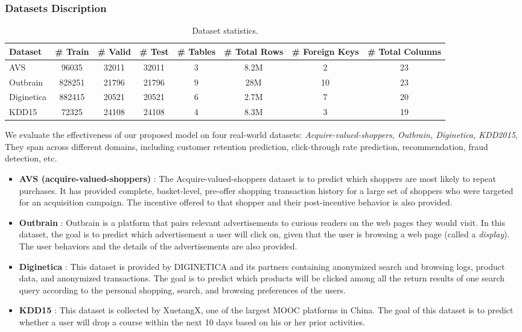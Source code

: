 \subsubsection{Datasets Discription}
\begin{table*}
    \caption{Dataset statistics.}
    \renewcommand\arraystretch{1.25}
    \centering
    \begin{tabular}{l|c|c|c|c|c|c|c}
        \toprule
        Dataset & \# Train & \# Valid & \# Test & \# Tables & \# Total Rows & \# Foreign Keys & \# Total Columns \\
        \midrule
        AVS         & 96035  & 32011 & 32011 & 3 & 8.2M & 2  & 23  \\
        Outbrain    & 828251 & 21796 & 21796 & 9 & 28M  & 10 & 23  \\
        Diginetica  & 882415 & 20521 & 20521 & 6 & 2.7M & 7  & 20  \\
        KDD15       & 72325  & 24108 & 24108 & 4 & 8.3M & 3  & 19  \\
        \bottomrule
    \end{tabular}
    \label{Dataset Information}
\end{table*}

We evaluate the effectiveness of our proposed model on four real-world datasets: 
\textit{Acquire-valued-shoppers, Outbrain, Diginetica, KDD2015}, They span across different domains, including customer retention prediction, click-through rate prediction, recommendation, fraud detection, etc.
\begin{itemize}[leftmargin=*]
\item \textbf{AVS (acquire-valued-shoppers)} \cite{acquire-valued-shoppers-challenge}: The Acquire-valued-shoppers dataset is to predict which shoppers are most likely to repeat purchases. It has provided complete, basket-level, pre-offer shopping transaction history for a large set of shoppers who were targeted for an acquisition campaign. The incentive offered to that shopper and their post-incentive behavior is also provided.
\item \textbf{Outbrain} \cite{outbrain-click-prediction}: Outbrain is a platform that pairs relevant advertisements to curious readers on the web pages they would visit. In this dataset, the goal is to predict which advertisement a user will click on, given that the user is browsing a web page (called a \emph{display}). The user behaviors and the details of the advertisements are also provided. %
\item \textbf{Diginetica} \cite{diginetica}: This dataset is provided by DIGINETICA and its partners containing anonymized search and browsing logs, product data, and anonymized transactions. The goal is to predict which products will be clicked among all the return results of one search query according to the personal shopping, search, and browsing preferences of the users. 
\item \textbf{KDD15} \cite{KDD15}: This dataset is collected by XuetangX, one of the largest MOOC platforms in China. The goal of this dataset is to predict whether a user will drop a course within the next 10 days based on his or her prior activities.
\end{itemize}

